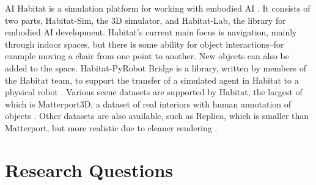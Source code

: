 AI Habitat is a simulation platform for working with embodied AI \cite{habitat19iccv}. It consists of two parts, Habitat-Sim, the 3D simulator, and Habitat-Lab, the library for embodied AI development. Habitat's current main focus is navigation, mainly through indoor spaces, but there is some ability for object interactions--for example moving a chair from one point to another. New objects can also be added to the space. Habitat-PyRobot Bridge is a library, written by members of the Habitat team, to support the transfer of a simulated agent in Habitat to a physical robot \cite{Kadian_2020}. Various scene datasets are supported by Habitat, the largest of which is Matterport3D, a dataset of real interiors with human annotation of objects \cite{matterport}.  Other datasets are also available, such as Replica, which is smaller than Matterport, but more realistic due to cleaner rendering \cite{replica}. 



\section{Research Questions}




